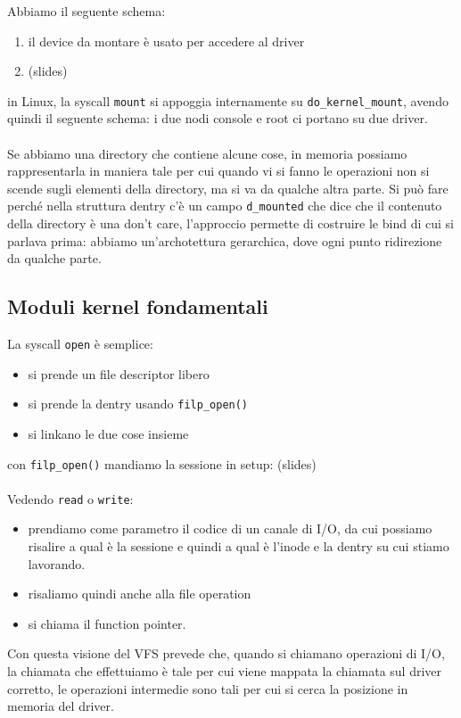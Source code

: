 \documentclass[12pt, oneside]{extbook}
\begin{document}
Abbiamo il seguente schema:
\begin{enumerate}
	\item il device da montare è usato per accedere al driver
	\item (slides)
\end{enumerate}
in Linux, la syscall \texttt{mount} si appoggia internamente su \texttt{do\_kernel\_mount}, avendo quindi il seguente schema:
i due nodi console e root ci portano su due driver.\\\\Se abbiamo una directory che contiene alcune cose, in memoria possiamo rappresentarla in maniera tale per cui quando vi si fanno le operazioni non si scende sugli elementi della directory, ma si va da qualche altra parte. Si può fare perché nella struttura dentry c'è un campo \texttt{d\_mounted} che dice che il contenuto della directory è una don't care, l'approccio permette di costruire le bind di cui si parlava prima: abbiamo un'archotettura gerarchica, dove ogni punto ridirezione da qualche parte.
\subsection{Moduli kernel fondamentali}
La syscall \texttt{open} è semplice:
\begin{itemize}
	\item si prende un file descriptor libero
	\item si prende la dentry usando \texttt{filp\_open()}
	\item si linkano le due cose insieme
\end{itemize}
con \texttt{filp\_open()} mandiamo la sessione in setup:
(slides)\\\\Vedendo \texttt{read} o \texttt{write}:
\begin{itemize}
	\item prendiamo come parametro il codice di un canale di I/O, da cui possiamo risalire a qual è la sessione e quindi a qual è l'inode e la dentry su cui stiamo lavorando. 
	\item risaliamo quindi anche alla file operation
	\item si chiama il function pointer.
\end{itemize}
Con questa visione del VFS prevede che, quando si chiamano operazioni di I/O, la chiamata che effettuiamo è tale per cui viene mappata la chiamata sul driver corretto, le operazioni intermedie sono tali per cui si cerca la posizione in memoria del driver.
\end{document}

